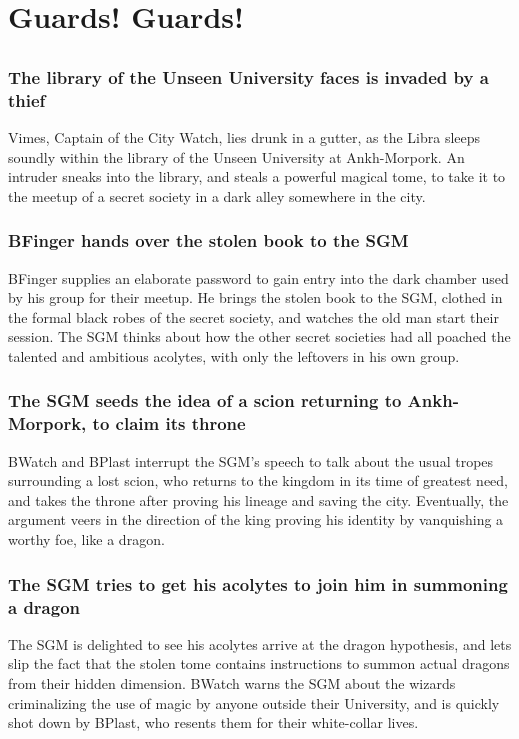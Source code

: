 \section{Guards! Guards!}


\subsection{}
\subsubsection{The library of the Unseen University faces is invaded by a thief}
\Gls{Vimes}, Captain of the City Watch, lies drunk in a gutter, as the \Gls{Libra} sleeps soundly
within the library of the Unseen University at Ankh-Morpork. An intruder sneaks into the library,
and steals a powerful magical tome, to take it to the meetup of a secret society in a dark alley
somewhere in the city.

\subsubsection{\Gls{BFinger} hands over the stolen book to the \Gls{SGM}}
\Gls{BFinger} supplies an elaborate password to gain entry into the dark chamber used by his group
for their meetup. He brings the stolen book to the \Gls{SGM}, clothed in the formal black robes of
the secret society, and watches the old man start their session. The \Gls{SGM} thinks about how the
other secret societies had all poached the talented and ambitious acolytes, with only the leftovers
in his own group.

\subsubsection{The \Gls{SGM} seeds the idea of a scion returning to Ankh-Morpork, to claim its
    throne}
\Gls{BWatch} and \Gls{BPlast} interrupt the \Gls{SGM}'s speech to talk about the usual tropes
surrounding a lost scion, who returns to the kingdom in its time of greatest need, and takes the
throne after proving his lineage and saving the city. Eventually, the argument veers in the
direction of the king proving his identity by vanquishing a worthy foe, like a dragon.

\subsubsection{The \Gls{SGM} tries to get his acolytes to join him in summoning a dragon}
The \Gls{SGM} is delighted to see his acolytes arrive at the dragon hypothesis, and lets slip the
fact that the stolen tome contains instructions to summon actual dragons from their hidden
dimension. \Gls{BWatch} warns the \Gls{SGM} about the wizards criminalizing the use of magic by
anyone outside their University, and is quickly shot down by \Gls{BPlast}, who resents them for
their white-collar lives.

